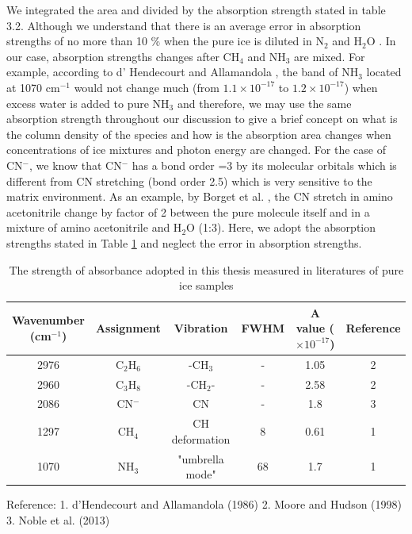 We integrated the area and divided by the absorption strength stated in table 3.2. Although we understand that there is an average error in absorption strengths of no more than 10 \%  when the pure ice is diluted in N$_2$ and H$_2$O \cite{richey2012near}. In our case, absorption strengths changes after CH$_4$ and NH$_3$ are mixed. For example, according to d' Hendecourt and Allamandola \cite{d1986time}, the band of NH$_3$ located at 1070 cm$^{-1}$ would not change much (from $1.1 \times 10^{-17}$ to $1.2 \times 10^{-17}$) when excess water is added to pure NH$_3$ and therefore, we may use the same absorption strength throughout our discussion to give a brief concept on what is the column density of the species and how is the absorption area changes when concentrations of ice mixtures and photon energy are changed. For the case of CN$^-$, we know that CN$^-$ has a bond order =3 by its molecular orbitals which is different from CN stretching (bond order 2.5) which is very sensitive to the matrix environment. As an example, by Borget et al. \cite{borget2012aminoacetonitrile}, the CN stretch in amino acetonitrile change by factor of 2 between the pure molecule itself and in a mixture of amino acetonitrile and H$_2$O (1:3). Here, we adopt the absorption strengths stated in Table \ref{tab:Absorbance} and neglect the error in absorption strengths.\\

\begin{table}[htbp]
\caption{The strength of absorbance adopted in this thesis measured in literatures of pure ice samples}
\label{tab:Absorbance}
\begin{tabular}{cccccc}
\hline
\hline
Wavenumber (cm$^{-1}$) & Assignment  & Vibration & FWHM & A value ($\times 10^{-17}$) & Reference \\
\hline
2976 &  C$_2$H$_6$ & -CH$_3$ & - & 1.05 & 2 \\
2960 & C$_3$H$_8$ & -CH$_2$- & - & 2.58 & 2 \\
2086 & CN$^-$ & CN & - & 1.8 & 3 \\
1297 & CH$_4$ & CH deformation & 8 & 0.61 & 1 \\
1070 & NH$_3$ & "umbrella mode" & 68 & 1.7 & 1 \\
\hline
\end{tabular}
Reference: 1. d'Hendecourt and Allamandola (1986)\cite{d1986time} 2. Moore and Hudson (1998)\cite{moore1998infrared} 3. Noble et al. (2013) \cite{noble2012thermal}
\end{table}


